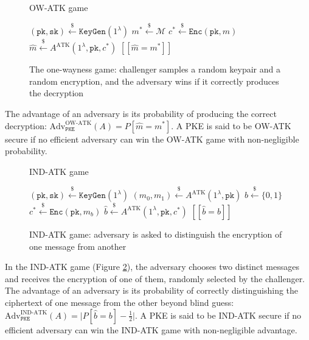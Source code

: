 \documentclass[runningheads]{llncs}
\newcommand{\pke}{\texttt{PKE}}
\newcommand{\keygen}{\texttt{KeyGen}}
\newcommand{\encrypt}{\texttt{Enc}}
\newcommand{\pk}{\texttt{pk}}
\newcommand{\sk}{\texttt{sk}}
\newcommand{\leftsample}{\stackrel{\$}{\leftarrow}}
\newcommand{\llbrack}{[\![}
\newcommand{\rrbrack}{]\!]}
\begin{document}
\begin{figure}[h]
    \centering
    \begin{minipage}[t]{0.45\textwidth}
    \begin{algorithm}[H]
        \caption*{OW-ATK game}
        \begin{algorithmic}[1]
            \State $(\pk, \sk) \leftsample \keygen(1^\lambda)$
            \State $m^\ast \leftsample \mathcal{M}$
            \State $c^\ast \leftsample \encrypt(\pk, m)$
            \State $\hat{m} \leftsample A^\text{ATK}(1^\lambda, \pk, c^\ast)$
            \State \Return $\llbrack \hat{m} = m^\ast \rrbrack$
        \end{algorithmic}
    \end{algorithm}
    \end{minipage}
    \caption{The one-wayness game: challenger samples a random keypair and a random encryption, and the adversary wins if it correctly produces the decryption}\label{fig:pke-ow-atk-game}
\end{figure}

The advantage of an adversary is its probability of producing the correct decryption: $\text{Adv}^\text{OW-ATK}_\pke(A) = P[\hat{m} = m^\ast]$. A PKE is said to be OW-ATK secure if no efficient adversary can win the OW-ATK game with non-negligible probability.

\begin{figure}[h]
    \centering
    \begin{minipage}[t]{0.5\textwidth}
        \begin{algorithm}[H]
            \caption*{IND-ATK game}
            \begin{algorithmic}[1]
                \State $(\pk, \sk) \leftsample \keygen(1^\lambda)$
                \State $(m_0, m_1) \leftsample A^\text{ATK}(1^\lambda, \pk)$
                \State $b \leftsample \{0,1\}$
                \State $c^\ast \leftsample \encrypt(\pk, m_b)$
                \State $\hat{b} \leftsample A^\text{ATK}(1^\lambda, \pk, c^\ast)$
                \State \Return $\llbrack \hat{b} = b \rrbrack$
            \end{algorithmic}
        \end{algorithm}
    \end{minipage}
    \caption{IND-ATK game: adversary is asked to distinguish the encryption of one message from another}\label{fig:pke-ind-atk-game}
\end{figure}

In the IND-ATK game (Figure \ref{fig:pke-ind-atk-game}), the adversary chooses two distinct messages and receives the encryption of one of them, randomly selected by the challenger. The advantage of an adversary is its probability of correctly distinguishing the ciphertext of one message from the other beyond blind guess: $\text{Adv}^\text{IND-ATK}_\pke(A) = \vert P[\hat{b} = b] - \frac{1}{2}\vert$. A PKE is said to be IND-ATK secure if no efficient adversary can win the IND-ATK game with non-negligible advantage.
\end{document}
